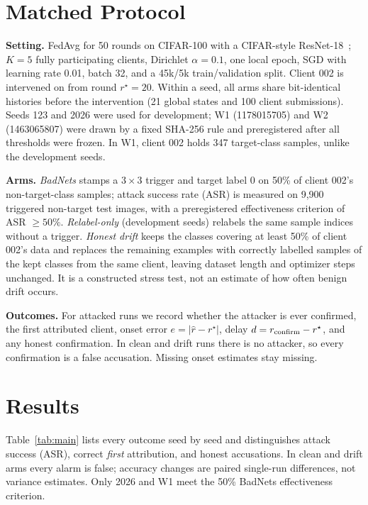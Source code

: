 \documentclass{article}
\begin{document}
\section{Matched Protocol}
\label{sec:protocol}

\textbf{Setting.} FedAvg for 50 rounds on CIFAR-100 with a CIFAR-style ResNet-18~\cite{he2016resnet}; $K=5$ fully participating clients, Dirichlet $\alpha=0.1$, one local epoch, SGD with learning rate 0.01, batch 32, and a 45k/5k train/validation split. Client 002 is intervened on from round $r^\star=20$. Within a seed, all arms share bit-identical histories before the intervention (21 global states and 100 client submissions). Seeds 123 and 2026 were used for development; W1 (1178015705) and W2 (1463065807) were drawn by a fixed SHA-256 rule and preregistered after all thresholds were frozen. In W1, client 002 holds 347 target-class samples, unlike the development seeds.

\textbf{Arms.} \emph{BadNets} stamps a $3\times3$ trigger and target label 0 on 50\% of client 002's non-target-class samples; attack success rate (ASR) is measured on 9,900 triggered non-target test images, with a preregistered effectiveness criterion of ASR $\ge50\%$. \emph{Relabel-only} (development seeds) relabels the same sample indices without a trigger. \emph{Honest drift} keeps the classes covering at least 50\% of client 002's data and replaces the remaining examples with correctly labelled samples of the kept classes from the same client, leaving dataset length and optimizer steps unchanged. It is a constructed stress test, not an estimate of how often benign drift occurs.

\textbf{Outcomes.} For attacked runs we record whether the attacker is ever confirmed, the first attributed client, onset error $e=|\hat r-r^\star|$, delay $d=r_{\rm confirm}-r^\star$, and any honest confirmation. In clean and drift runs there is no attacker, so every confirmation is a false accusation. Missing onset estimates stay missing.

\section{Results}
\label{sec:results}



Table~\ref{tab:main} lists every outcome seed by seed and distinguishes attack success (ASR), correct \emph{first} attribution, and honest accusations. In clean and drift arms every alarm is false; accuracy changes are paired single-run differences, not variance estimates. Only 2026 and W1 meet the 50\% BadNets effectiveness criterion.
\end{document}
